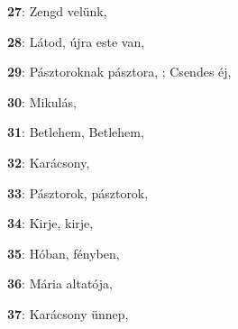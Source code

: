 \begin{minipage}{0.5\textwidth}
\textbf{27}: Zengd velünk, \pageref{ZengdvelC3BCnk}
\end{minipage}\vspace{0.1cm}
\begin{minipage}{0.5\textwidth}
\textbf{28}: Látod, újra este van, \pageref{LC3A1tod2CC3BAjraestevan}
\end{minipage}\vspace{0.1cm}
\begin{minipage}{0.5\textwidth}
\textbf{29}: Pásztoroknak pásztora, \pageref{PC3A1sztoroknakpC3A1sztora}; Csendes éj, \pageref{CsendesC3A9j}
\end{minipage}\vspace{0.1cm}
\begin{minipage}{0.5\textwidth}
\textbf{30}: Mikulás, \pageref{MikulC3A1s}
\end{minipage}\vspace{0.1cm}
\begin{minipage}{0.5\textwidth}
\textbf{31}: Betlehem, Betlehem, \pageref{Betlehem2CBetlehem}
\end{minipage}\vspace{0.1cm}
\begin{minipage}{0.5\textwidth}
\textbf{32}: Karácsony, \pageref{KarC3A1csony}
\end{minipage}\vspace{0.1cm}
\begin{minipage}{0.5\textwidth}
\textbf{33}: Pásztorok, pásztorok, \pageref{PC3A1sztorok2CpC3A1sztorok}
\end{minipage}\vspace{0.1cm}
\begin{minipage}{0.5\textwidth}
\textbf{34}: Kirje, kirje, \pageref{Kirje2Ckirje}
\end{minipage}\vspace{0.1cm}
\begin{minipage}{0.5\textwidth}
\textbf{35}: Hóban, fényben, \pageref{HC3B3ban2CfC3A9nyben}
\end{minipage}\vspace{0.1cm}
\begin{minipage}{0.5\textwidth}
\textbf{36}: Mária altatója, \pageref{MC3A1riaaltatC3B3ja}
\end{minipage}\vspace{0.1cm}
\begin{minipage}{0.5\textwidth}
\textbf{37}: Karácsony ünnep, \pageref{KarC3A1csonyC3BCnnep}
\end{minipage}\vspace{0.1cm}
